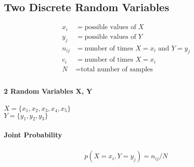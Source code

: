 \documentclass{article}
\begin{document}
\subsection{Two Discrete Random Variables}
\begin{align*}
    x_i    & = \text{possible values of $X$}                  \\
    y_j    & = \text{possible values of $Y$}                  \\
    n_{ij} & = \text{number of times $X = x_i$ and $Y = y_j$} \\
    c_i    & = \text{number of times $X = x_i$}               \\
    N      & = \text{total number of samples}                 \\
\end{align*}

\paragraph{2 Random Variables X, Y}
\begin{center}
    $X = \{ x_1, x_2, x_3, x_4, x_5 \}$ \\
    $Y = \{ y_1, y_2, y_3 \}$
\end{center}

\paragraph{Joint Probability}
\begin{align*}
    p(X = x_i, Y = y_j) = n_{ij}/N
\end{align*}
\end{document}
